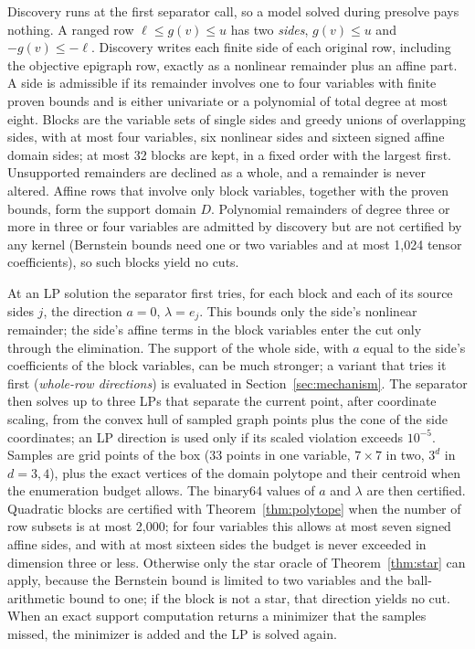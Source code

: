 Discovery runs at the first separator call, so a model solved during presolve
pays nothing. A ranged row $\ell\le g(v)\le u$ has two \emph{sides},
$g(v)\le u$ and $-g(v)\le-\ell$. Discovery writes each finite side of each
original row, including the objective epigraph row, exactly as a nonlinear
remainder plus an affine part. A side is admissible if its remainder involves
one to four variables with finite proven bounds and is either univariate or a
polynomial of total degree at most eight. Blocks are the variable sets of
single sides and greedy unions of overlapping sides, with at most four
variables, six nonlinear sides and sixteen signed affine domain sides; at
most 32 blocks are kept, in a fixed order with the largest first. Unsupported
remainders are declined as a whole, and a remainder is never altered. Affine
rows that involve only block variables, together with the proven bounds,
form the support domain $D$. Polynomial remainders of degree three or more in
three or four variables are admitted by discovery but are not certified by
any kernel (Bernstein bounds need one or two variables and at most 1{,}024
tensor coefficients), so such blocks yield no cuts.

At an LP solution the separator first tries, for each block and each of its
source sides $j$, the direction $a=0$, $\lambda=e_j$. This bounds only the
side's nonlinear remainder; the side's affine terms in the block variables
enter the cut only through the elimination. The support of the whole side,
with $a$ equal to the side's coefficients of the block variables, can be much
stronger; a variant that tries it first (\emph{whole-row directions}) is
evaluated in Section~\ref{sec:mechanism}. The
separator then solves up to three LPs that separate the current point, after
coordinate scaling, from the convex hull of sampled graph points plus the
cone of the side coordinates; an LP direction is used only if its scaled
violation exceeds $10^{-5}$. Samples are grid points of the box (33 points in
one variable, $7\times7$ in two, $3^d$ in $d=3,4$), plus the exact vertices of
the domain polytope and their centroid when the enumeration budget allows.
The binary64 values of $a$ and $\lambda$ are then certified. Quadratic blocks
are certified with Theorem~\ref{thm:polytope} when the number of row subsets
is at most 2{,}000; for four variables this allows at most seven signed
affine sides, and with at most sixteen sides the budget is never exceeded in
dimension three or less. Otherwise only the star oracle of
Theorem~\ref{thm:star} can apply, because the Bernstein bound is limited to
two variables and the ball-arithmetic bound to one; if the block is not a
star, that direction yields no cut. When an exact support computation returns
a minimizer that the samples missed, the minimizer is added and the LP is
solved again.

